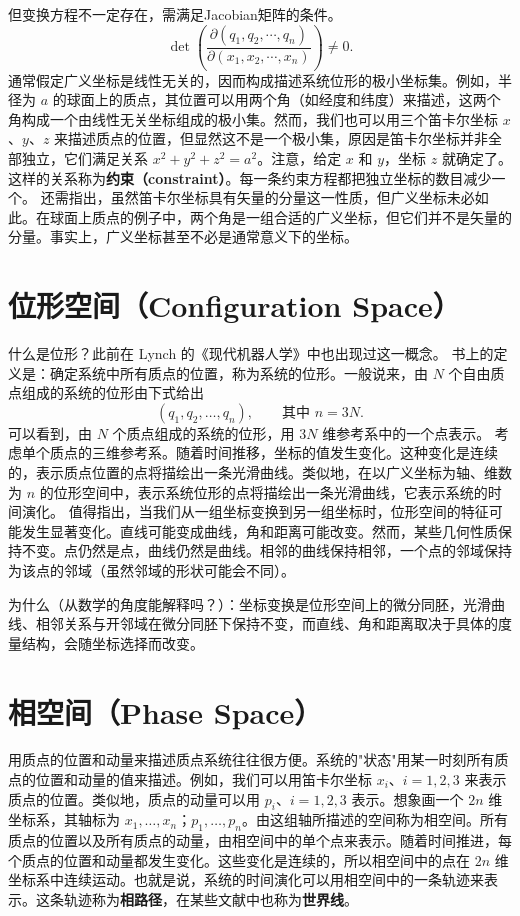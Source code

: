 但变换方程不一定存在，需满足Jacobian矩阵的条件。
\[
\det\left(\frac{\partial(q_1, q_2, \cdots, q_n)}{\partial(x_1, x_2, \cdots, x_n)}\right) \neq 0.
\]
通常假定广义坐标是线性无关的，因而构成描述系统位形的极小坐标集。例如，半径为 $a$ 的球面上的质点，其位置可以用两个角（如经度和纬度）来描述，这两个角构成一个由线性无关坐标组成的极小集。然而，我们也可以用三个笛卡尔坐标 $x$、$y$、$z$ 来描述质点的位置，但显然这不是一个极小集，原因是笛卡尔坐标并非全部独立，它们满足关系 $x^2 + y^2 + z^2 = a^2$。注意，给定 $x$ 和 $y$，坐标 $z$ 就确定了。这样的关系称为\textbf{约束（constraint）}。每一条约束方程都把独立坐标的数目减少一个。
还需指出，虽然笛卡尔坐标具有矢量的分量这一性质，但广义坐标未必如此。在球面上质点的例子中，两个角是一组合适的广义坐标，但它们并不是矢量的分量。事实上，广义坐标甚至不必是通常意义下的坐标。
\section{位形空间（Configuration Space）}
什么是位形？此前在 Lynch 的《现代机器人学》中也出现过这一概念。
书上的定义是：确定系统中所有质点的位置，称为系统的位形。一般说来，由 $N$ 个自由质点组成的系统的位形由下式给出
\[
(q_1, q_2, \ldots, q_n), \qquad \text{其中 } n = 3N.
\]
可以看到，由 $N$ 个质点组成的系统的位形，用 $3N$ 维参考系中的一个点表示。
考虑单个质点的三维参考系。随着时间推移，坐标的值发生变化。这种变化是连续的，表示质点位置的点将描绘出一条光滑曲线。类似地，在以广义坐标为轴、维数为 $n$ 的位形空间中，表示系统位形的点将描绘出一条光滑曲线，它表示系统的时间演化。
值得指出，当我们从一组坐标变换到另一组坐标时，位形空间的特征可能发生显著变化。直线可能变成曲线，角和距离可能改变。然而，某些几何性质保持不变。点仍然是点，曲线仍然是曲线。相邻的曲线保持相邻，一个点的邻域保持为该点的邻域（虽然邻域的形状可能会不同）。
\begin{note}
为什么（从数学的角度能解释吗？）：坐标变换是位形空间上的微分同胚，光滑曲线、相邻关系与开邻域在微分同胚下保持不变，而直线、角和距离取决于具体的度量结构，会随坐标选择而改变。
\end{note}
\section{相空间（Phase Space）}
用质点的位置和动量来描述质点系统往往很方便。系统的"状态"用某一时刻所有质点的位置和动量的值来描述。例如，我们可以用笛卡尔坐标 $x_i$、$i = 1, 2, 3$ 来表示质点的位置。类似地，质点的动量可以用 $p_i$、$i = 1, 2, 3$ 表示。想象画一个 $2n$ 维坐标系，其轴标为 $x_1, \ldots, x_n$；$p_1, \ldots, p_n$。由这组轴所描述的空间称为相空间。所有质点的位置以及所有质点的动量，由相空间中的单个点来表示。随着时间推进，每个质点的位置和动量都发生变化。这些变化是连续的，所以相空间中的点在 $2n$ 维坐标系中连续运动。也就是说，系统的时间演化可以用相空间中的一条轨迹来表示。这条轨迹称为\textbf{相路径}，在某些文献中也称为\textbf{世界线}。
